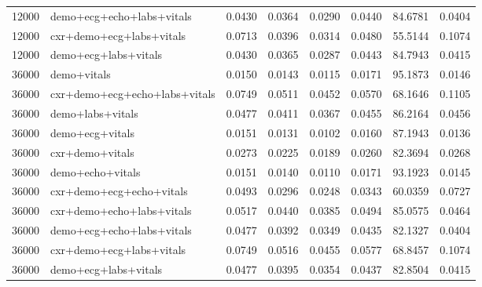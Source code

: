 \begin{tabular}{rlrrrrrr}
12000 & demo+ecg+echo+labs+vitals & 0.0430 & 0.0364 & 0.0290 & 0.0440 & 84.6781 & 0.0404 \\
12000 & cxr+demo+ecg+labs+vitals & 0.0713 & 0.0396 & 0.0314 & 0.0480 & 55.5144 & 0.1074 \\
12000 & demo+ecg+labs+vitals & 0.0430 & 0.0365 & 0.0287 & 0.0443 & 84.7943 & 0.0415 \\
36000 & demo+vitals & 0.0150 & 0.0143 & 0.0115 & 0.0171 & 95.1873 & 0.0146 \\
36000 & cxr+demo+ecg+echo+labs+vitals & 0.0749 & 0.0511 & 0.0452 & 0.0570 & 68.1646 & 0.1105 \\
36000 & demo+labs+vitals & 0.0477 & 0.0411 & 0.0367 & 0.0455 & 86.2164 & 0.0456 \\
36000 & demo+ecg+vitals & 0.0151 & 0.0131 & 0.0102 & 0.0160 & 87.1943 & 0.0136 \\
36000 & cxr+demo+vitals & 0.0273 & 0.0225 & 0.0189 & 0.0260 & 82.3694 & 0.0268 \\
36000 & demo+echo+vitals & 0.0151 & 0.0140 & 0.0110 & 0.0171 & 93.1923 & 0.0145 \\
36000 & cxr+demo+ecg+echo+vitals & 0.0493 & 0.0296 & 0.0248 & 0.0343 & 60.0359 & 0.0727 \\
36000 & cxr+demo+echo+labs+vitals & 0.0517 & 0.0440 & 0.0385 & 0.0494 & 85.0575 & 0.0464 \\
36000 & demo+ecg+echo+labs+vitals & 0.0477 & 0.0392 & 0.0349 & 0.0435 & 82.1327 & 0.0404 \\
36000 & cxr+demo+ecg+labs+vitals & 0.0749 & 0.0516 & 0.0455 & 0.0577 & 68.8457 & 0.1074 \\
36000 & demo+ecg+labs+vitals & 0.0477 & 0.0395 & 0.0354 & 0.0437 & 82.8504 & 0.0415 \\
\bottomrule
\end{tabular}
